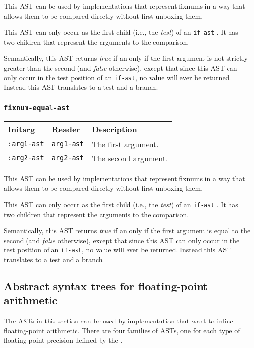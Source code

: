This AST can be used by implementations that represent fixnums in a
way that allows them to be compared directly without first unboxing
them.

This AST can only occur as the first child (i.e., the \emph{test}) of
an \texttt{if-ast} .  It has two children that
represent the arguments to the comparison.  

Semantically, this AST returns \emph{true} if an only if the first
argument is not strictly greater than the second (and \emph{false}
otherwise), except that since this AST can only occur in the test
position of an \texttt{if-ast}, no value will ever be returned.
Instead this AST translates to a test and a branch. 

\subsubsection{\texttt{fixnum-equal-ast}}
\label{fixnum-equal-ast}

\begin{tabular}{|l|l|l|}
\hline
Initarg & Reader & Description\\
\hline\hline
\texttt{:arg1-ast} & \texttt{arg1-ast} & The first argument.\\
\hline
\texttt{:arg2-ast} & \texttt{arg2-ast} & The second argument.\\
\hline
\end{tabular}

This AST can be used by implementations that represent fixnums in a
way that allows them to be compared directly without first unboxing
them.

This AST can only occur as the first child (i.e., the \emph{test}) of
an \texttt{if-ast} .  It has two children that
represent the arguments to the comparison.  

Semantically, this AST returns \emph{true} if an only if the first
argument is equal to the second (and \emph{false} otherwise), except
that since this AST can only occur in the test position of an
\texttt{if-ast}, no value will ever be returned.  Instead this AST
translates to a test and a branch.

\subsection{Abstract syntax trees for floating-point arithmetic}
\label{sec-ast-floating-point-arithmetic}

The ASTs in this section can be used by implementation that want to
inline floating-point arithmetic.  There are four families of ASTs,
one for each type of floating-point precision defined by the \hs{}.

